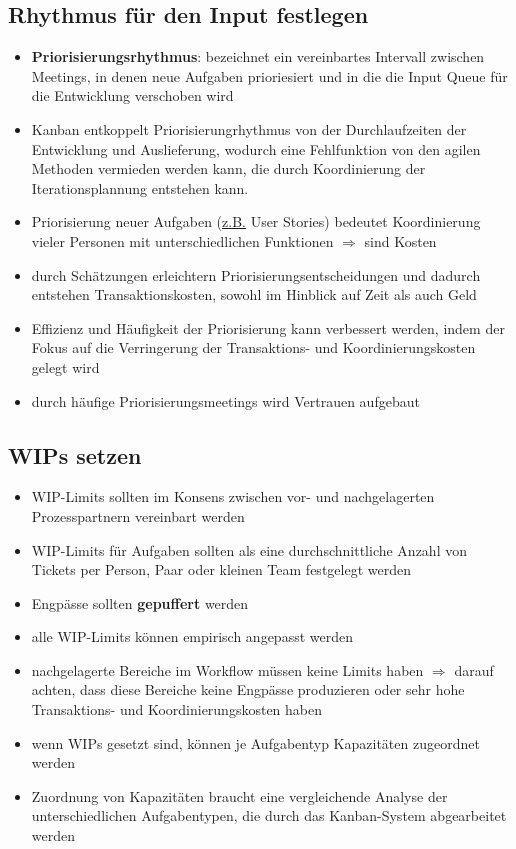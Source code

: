\subsection{Rhythmus für den Input festlegen}
\begin{itemize}
  \item \textbf{Priorisierungsrhythmus}: bezeichnet ein vereinbartes Intervall zwischen Meetings, in
    denen neue Aufgaben prioriesiert und in die die Input Queue für die Entwicklung verschoben wird
  \item  Kanban entkoppelt Priorisierungrhythmus von der Durchlaufzeiten der Entwicklung und
    Auslieferung, wodurch eine Fehlfunktion von den agilen Methoden vermieden werden kann, die durch
    Koordinierung der Iterationsplannung entstehen kann.
  \item Priorisierung neuer Aufgaben (\uline{z.B.} User Stories) bedeutet Koordinierung vieler
    Personen mit unterschiedlichen Funktionen $\Rightarrow$ sind Kosten
  \item durch Schätzungen erleichtern Priorisierungsentscheidungen und dadurch entstehen
    Transaktionskosten, sowohl im Hinblick auf Zeit als auch Geld
  \item Effizienz und Häufigkeit der Priorisierung kann verbessert werden, indem der Fokus auf die
    Verringerung der Transaktions- und Koordinierungskosten gelegt wird
  \item durch häufige Priorisierungsmeetings wird Vertrauen aufgebaut
\end{itemize}


\subsection{WIPs setzen}
\begin{itemize}
  \item WIP-Limits sollten im Konsens zwischen vor- und nachgelagerten Prozesspartnern vereinbart
    werden
  \item WIP-Limits für Aufgaben sollten als eine durchschnittliche Anzahl von Tickets per Person,
    Paar oder kleinen Team festgelegt werden
  \item Engpässe sollten \textbf{gepuffert} werden
  \item alle WIP-Limits können empirisch angepasst werden
  \item nachgelagerte Bereiche im Workflow müssen keine Limits haben $\Rightarrow$  darauf achten,
    dass diese Bereiche keine Engpässe produzieren oder sehr hohe Transaktions- und
    Koordinierungskosten haben
  \item wenn WIPs gesetzt sind, können je Aufgabentyp Kapazitäten zugeordnet werden
  \item Zuordnung von Kapazitäten braucht eine vergleichende Analyse der unterschiedlichen
    Aufgabentypen, die durch das Kanban-System abgearbeitet werden
\end{itemize}


